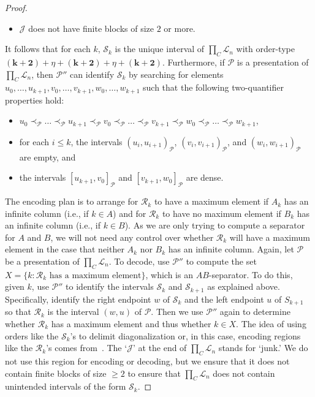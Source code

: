\documentclass[11pt,a4paper,reqno]{amsart}
\theoremstyle{definition}
\newcommand{\mc}[1]{\mathcal{#1}}
\begin{document}
\begin{proof}
\begin{itemize}
\item $\mc{J}$ does not have finite blocks of size $2$ or more.
\end{itemize}
It follows that for each $k$, $\mc{S}_k$ is the unique interval of $\prod_C \mc{L}_n$ with order-type $(\bm{k+2}) + \eta + (\bm{k+2}) + \eta + (\bm{k+2})$.  Furthermore, if $\mc{P}$ is a presentation of $\prod_C \mc{L}_n$, then $\mc{P}''$ can identify $\mc{S}_k$ by searching for elements $u_0, \dots, u_{k+1}, v_0, \dots, v_{k+1}, w_0, \dots, w_{k+1}$ such that the following two-quantifier properties hold:
\begin{itemize}
\item $u_0 \prec_{\mc P} \dots \prec_{\mc P} u_{k+1} \prec_{\mc P} v_0 \prec_{\mc P} \dots \prec_{\mc P} v_{k+1} \prec_{\mc P} w_0 \prec_{\mc P} \dots \prec_{\mc P} w_{k+1}$,
\item for each $i \leq k$, the intervals $(u_i, u_{i+1})_{\mc P}$, $(v_i, v_{i+1})_{\mc P}$, and $(w_i, w_{i+1})_{\mc P}$ are empty, and
\item the intervals $[u_{k+1}, v_0]_{\mc P}$ and $[v_{k+1}, w_0]_{\mc P}$ are dense.
\end{itemize}
The encoding plan is to arrange for $\mc{R}_k$ to have a maximum element if $A_k$ has an infinite column (i.e., if $k \in A$) and for $\mc{R}_k$ to have no maximum element if $B_k$ has an infinite column (i.e., if $k \in B$).  As we are only trying to compute a separator for $A$ and $B$, we will not need any control over whether $\mc{R}_k$ will have a maximum element in the case that neither $A_k$ nor $B_k$ has an infinite column.  Again, let $\mc{P}$ be a presentation of $\prod_C \mc{L}_n$.  To decode, use $\mc{P}''$ to compute the set $X = \{k : \text{$\mc{R}_k$ has a maximum element}\}$, which is an $AB$-separator.  To do this, given $k$, use $\mc{P}''$ to identify the intervals $\mc{S}_k$ and $\mc{S}_{k+1}$ as explained above.  Specifically, identify the right endpoint $w$ of $\mc{S}_k$ and the left endpoint $u$ of $S_{k+1}$ so that $\mc{R}_k$ is the interval $(w,u)$ of $\mc{P}$.  Then we use $\mc{P}''$ again to determine whether $\mc{R}_k$ has a maximum element and thus whether $k \in X$.  The idea of using orders like the $\mc{S}_k$'s to delimit diagonalization or, in this case, encoding regions like the $\mc{R}_k$'s comes from~\cite{JockuschSoareLO}.  The `$\mc{J}$' at the end of $\prod_C \mc{L}_n$ stands for `junk.'  We do not use this region for encoding or decoding, but we ensure that it does not contain finite blocks of size $\geq\! 2$ to ensure that $\prod_C \mc{L}_n$ does not contain unintended intervals of the form $\mc{S}_k$.


\end{proof}
\end{document}
